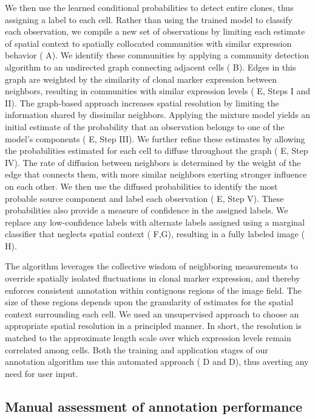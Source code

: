 \documentclass[10pt,letterpaper]{article}
\begin{document}
We then use the learned conditional probabilities to detect entire clones, thus assigning a label to each cell. Rather than using the trained model to classify each observation, we compile a new set of observations by limiting each estimate of spatial context to spatially collocated communities with similar expression behavior ( A). We identify these communities by applying a community detection algorithm to an undirected graph connecting adjacent cells ( B). Edges in this graph are weighted by the similarity of clonal marker expression between neighbors, resulting in communities with similar expression levels ( E, Steps I and II). The graph-based approach increases spatial resolution by limiting the information shared by dissimilar neighbors. Applying the mixture model yields an initial estimate of the probability that an observation belongs to one of the model's components ( E, Step III). We further refine these estimates by allowing the probabilities estimated for each cell to diffuse throughout the graph ( E, Step IV). The rate of diffusion between neighbors is determined by the weight of the edge that connects them, with more similar neighbors exerting stronger influence on each other. We then use the diffused probabilities to identify the most probable source component and label each observation ( E, Step V). These probabilities also provide a measure of confidence in the assigned labels. We replace any low-confidence labels with alternate labels assigned using a marginal classifier that neglects spatial context ( F,G), resulting in a fully labeled image ( H).

The algorithm leverages the collective wisdom of neighboring measurements to override spatially isolated fluctuations in clonal marker expression, and thereby enforces consistent annotation within contiguous regions of the image field. The size of these regions depends upon the granularity of estimates for the spatial context surrounding each cell. We used an unsupervised approach to choose an appropriate spatial resolution in a principled manner. In short, the resolution is matched to the approximate length scale over which expression levels remain correlated among cells. Both the training and application stages of our annotation algorithm use this automated approach ( D and  D), thus averting any need for user input.


\subsection*{Manual assessment of annotation performance}
\end{document}
